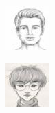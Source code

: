 \documentclass{IEEEcsmag}
\begin{document}
\begin{figure}[ht]
\begin{subfigure}{0.12\textwidth}
        \includegraphics[width=\linewidth]{Digital sketches/draws_resized/image16.jpeg}
    \end{subfigure}
    \begin{subfigure}{0.12\textwidth}
        \includegraphics[width=\linewidth]{Digital sketches/draws_resized/image8.jpeg}

\end{subfigure}
\end{figure}
\end{document}
